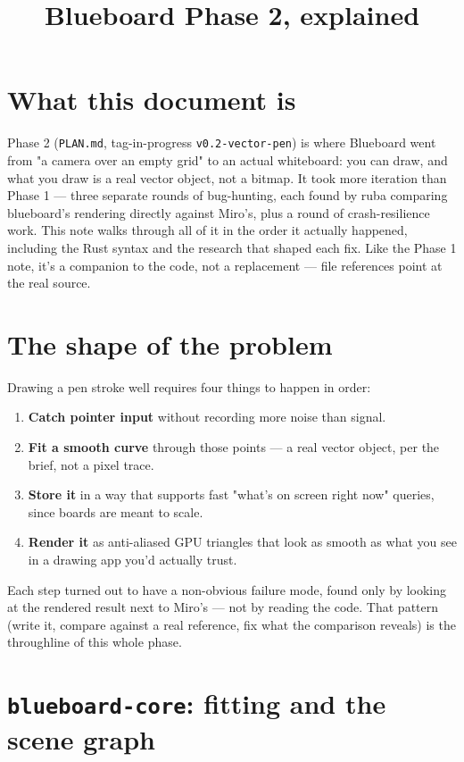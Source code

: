 \documentclass[11pt]{article}
\title{Blueboard Phase 2, explained}
\author{}
\date{}
\begin{document}
\maketitle

\section*{What this document is}
Phase 2 (\texttt{PLAN.md}, tag-in-progress \texttt{v0.2-vector-pen}) is where Blueboard
went from "a camera over an empty grid" to an actual whiteboard: you can draw, and what
you draw is a real vector object, not a bitmap. It took more iteration than Phase 1 —
three separate rounds of bug-hunting, each found by ruba comparing blueboard's rendering
directly against Miro's, plus a round of crash-resilience work. This note walks through
all of it in the order it actually happened, including the Rust syntax and the research
that shaped each fix. Like the Phase 1 note, it's a companion to the code, not a
replacement — file references point at the real source.

\tableofcontents

\section{The shape of the problem}
Drawing a pen stroke well requires four things to happen in order:
\begin{enumerate}
  \item \textbf{Catch pointer input} without recording more noise than signal.
  \item \textbf{Fit a smooth curve} through those points — a real vector object, per the
    brief, not a pixel trace.
  \item \textbf{Store it} in a way that supports fast "what's on screen right now"
    queries, since boards are meant to scale.
  \item \textbf{Render it} as anti-aliased GPU triangles that look as smooth as what you
    see in a drawing app you'd actually trust.
\end{enumerate}
Each step turned out to have a non-obvious failure mode, found only by looking at the
rendered result next to Miro's — not by reading the code. That pattern (write it, compare
against a real reference, fix what the comparison reveals) is the throughline of this
whole phase.

\section{\texttt{blueboard-core}: fitting and the scene graph}
\end{document}
